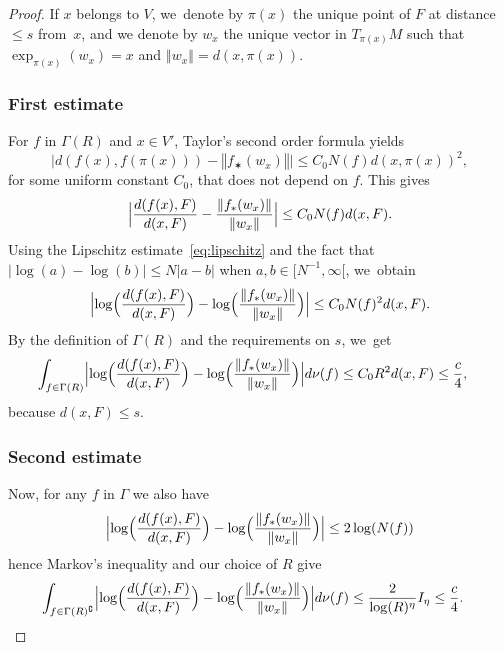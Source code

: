 \documentclass[11pt]{article}
\newcommand{\norm}[1]{{\left\Vert#1\right\Vert}}
\newcommand{\abs}[1]{\left\vert#1\right\vert}
\newcommand{\babs}[1]{\bigl\vert#1\bigr\vert}
\newcommand{\Babs}[1]{\Bigl\vert#1\Bigr\vert}
\newcommand{\Blrpar}[1]{\Bigl(#1\Bigr)}
\newcommand{\inv}{^{-1}}
\theoremstyle{plain}
\theoremstyle{definition}
\numberwithin{equation}{section}
\begin{document}
\begin{proof}
If $x$ belongs to $V$, we~denote by $\pi(x)$ the unique point of $F$ at distance $\leq s$ from~$x$, and we denote by $w_x$ the unique vector in $T_{\pi(x)}M$ such that $\exp_{\pi(x)}(w_x)=x$ and $\norm{w_x}=d(x,\pi(x))$.

\subsubsection*{First estimate}
For $f$ in $\Gamma(R)$ and $x\in V'$, Taylor's second order formula yields
\begin{equation}\label{eq:Taylor}
\babs{d(f(x),f(\pi(x))) - \norm{f_\varstar (w_x)}}\leq C_0 N(f)d(x, \pi(x))^2,
\end{equation}
for some uniform constant $C_0$, that does not depend on $f$. This gives
\begin{equation*}
\Babs{\frac{d(f(x),F)}{d(x, F)} - \frac{\norm{f_\varstar (w_x)}}{\norm{w_x}}} \leq C_0 N(f) d(x,F).
\end{equation*}
Using the Lipschitz estimate~\eqref{eq:lipschitz} and the fact that $\abs{\log(a) -\log(b)}\leq N\abs{a-b}$ when $a, b\in [N\inv,\infty[$, we~obtain
\begin{equation}\label{eq:delta_1}
\Babs{\log\Blrpar{\frac{d(f(x),F)}{d(x, F)}} - \log\Blrpar{\frac{\norm{f_\varstar (w_x)}}{\norm{w_x}}}} \leq C_0 N(f)^2 d(x,F).
\end{equation}
By the definition of $\Gamma(R)$ and the requirements on $s$, we~get
\begin{align*}
\int_{f\in \Gamma(R)} \Babs{\log\Blrpar{\frac{d(f(x),F)}{d(x, F)}}- \log\Blrpar{\frac{\norm{f_\varstar (w_x)}}{\norm{w_x}}}} d\nu(f) & \leq C_0 R^2 d(x,F) \leq \frac{c}{4},
\end{align*}
because $d(x,F)\leq s$.

\subsubsection*{Second estimate}
Now, for any $f$ in $\Gamma$ we also have
\begin{equation}\label{eq:lipschitz_log_ratio_estimate}
\Babs{\log\Blrpar{\frac{d(f(x),F)}{d(x, F)}} - \log\Blrpar{\frac{\norm{f_\varstar (w_x)}}{\norm{w_x}}}} \leq 2\log(N(f))
\end{equation}
hence Markov's inequality and our choice of $R$ give
\begin{align*}
\int_{f\in \Gamma(R)^\complement} \Babs{\log\Blrpar{\frac{d(f(x),F)}{d(x, F)}} - \log\Blrpar{\frac{\norm{f_\varstar (w_x)}}{\norm{w_x}}}} d\nu(f)& \leq \frac{2}{\log(R)^\eta}I_\eta \leq \frac{c}{4}.
\end{align*}


\end{proof}
\end{document}
